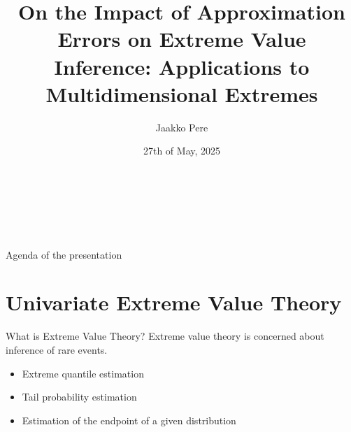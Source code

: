 \documentclass[11pt, aspectratio=169]{beamer}
\author[Jaakko Pere]{Jaakko Pere}
\title{On the Impact of Approximation Errors on Extreme Value Inference:
Applications to Multidimensional Extremes}
\date{27th of May, 2025}
\institute{Dep.\ of Mathematics and Statistics, University of Helsinki}
\begin{document}
{
  \begin{frame}
    \vspace{2.5cm}
    \begin{center}
      \textcolor{hyblue}{\bf\MakeUppercase{\Large\inserttitle}} \\
      {\large\insertauthor} \\
      {\large\insertdate} \\
      {\large\insertinstitute}
    \end{center}
  \end{frame}
}

\begin{frame}{Agenda of the presentation}
  \tableofcontents
\end{frame}

\section{Univariate Extreme Value Theory}


\begin{frame}{What is Extreme Value Theory?}
  Extreme value theory is concerned about inference of rare events.
  \pause
  \vspace{\baselineskip}
  \begin{itemize}
    \item Extreme quantile estimation
    \item Tail probability estimation
    \item Estimation of the endpoint of a given distribution
  \end{itemize}
\end{frame}

\end{document}
